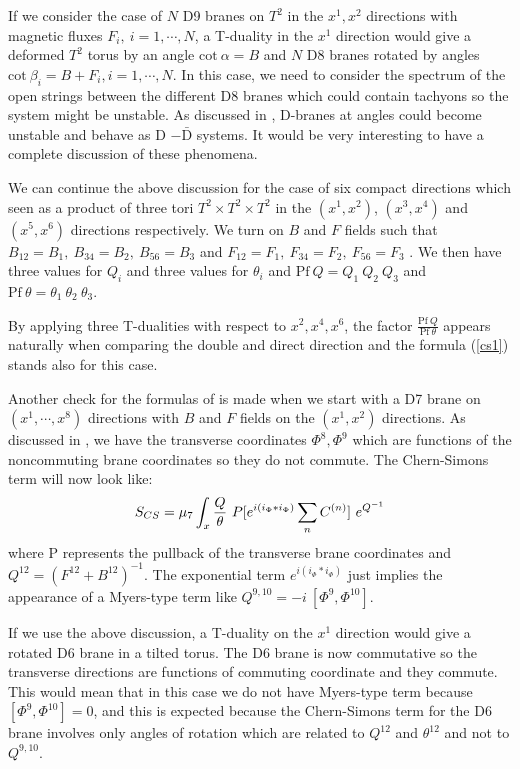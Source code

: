 \documentclass[a4paper,12pt]{article}
\begin{document}
If we consider the case of $N$ D9 branes on 
$T^2$ in the $x^1, x^2$ directions with magnetic fluxes 
$F_{i},~i = 1,\cdots,N$, a T-duality in the $x^1$ direction would 
give a deformed $T^2$ torus by an angle $\mbox{cot}~\alpha = B$ and 
$N$ D8 branes rotated by angles 
$\mbox{cot}~\beta_i = B + F_i,i = 1,\cdots,N$.
In this case, we need to consider the spectrum of the open strings between the
different D8 branes which could contain tachyons so the system might be 
unstable. As discussed in \cite{chen,blu1}, D-branes at angles could become
unstable and behave as D $- \bar{\mbox{D}}$ systems.
It would be very interesting to have a complete discussion of these
phenomena. 

We can continue the above discussion for the case of 
six compact directions which 
seen as a product of three tori $T^2 \times T^2 \times T^2$ 
in the $(x^1, x^2)$,
$(x^3, x^4)$ and $(x^5,x^6)$ directions respectively. 
We turn on $B$ and $F$ fields such that 
 $B_{12} = B_1,~B_{34} = B_2,~B_{56} = B_3$ and
 $F_{12} = F_1,~F_{34} = F_2,~F_{56} = F_3$ . We then have three values for
$Q_i$ and three values for $\theta_i$ and $\mbox{Pf}~Q = Q_1~Q_2~Q_3$ and
$\mbox{Pf}~\theta = \theta_1~\theta_2~\theta_3$. 

By applying three T-dualities with respect to $x^2, x^4, x^6$, the factor 
$\frac{\mbox{Pf}~Q}{\mbox{Pf}~\theta}$ appears naturally when comparing the
double and direct direction and the formula (\ref{cs1}) stands also
for this case.

Another check for the formulas of \cite{ms} is made when 
we start with a D7 brane on $(x^1,\cdots,x^8)$ directions with
$B$ and $F$ fields on the $(x^1, x^2)$ directions. As discussed in \cite{ms},
we have the transverse coordinates $\Phi^8, \Phi^9$ which are functions of the
noncommuting brane coordinates so they do not commute. 
The Chern-Simons term will now look like:
\begin{equation}
\label{csd}
S_{CS} = \mu_7 \int_x {Q \over \theta}~P[e^{i(i_{\Phi} * i_{\Phi})}
\sum_n C^{(n)}]~e^{Q^{-1}} 
\end{equation}
where P represents the pullback of the transverse brane coordinates and
$Q^{12} = (F^{12} + B^{12})^{-1}$. 
The exponential term $e^{i(i_{\Phi} * i_{\Phi})}$
just implies the appearance of a Myers-type term like 
$Q^{9,10} = - i~[\Phi^{9}, \Phi^{10}]$. 

If we use the above discussion, a T-duality on the $x^1$ direction would give
a rotated D6 brane in a tilted torus. The D6 brane is now commutative so the
transverse directions are functions of commuting coordinate and they 
commute. This would mean that in this case we do not have
Myers-type term because $[\Phi^{9}, \Phi^{10}] = 0$, and this is expected
because the Chern-Simons term for the D6 brane involves only angles of
rotation which are related to $Q^{12}$ and $\theta^{12}$ and not to 
$Q^{9,10}$.
\end{document}
